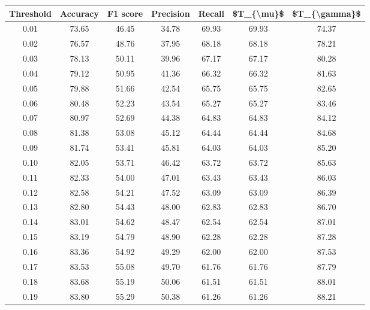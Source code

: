 \begin{tabular}{|c|c|c|c|c|c|c|}
\hline
 Threshold &  Accuracy &  F1 score &  Precision &  Recall &  \$T\_\{\textbackslash mu\}\$ &  \$T\_\{\textbackslash gamma\}\$ \\
\hline
      0.01 &     73.65 &     46.45 &      34.78 &   69.93 &      69.93 &         74.37 \\
      0.02 &     76.57 &     48.76 &      37.95 &   68.18 &      68.18 &         78.21 \\
      0.03 &     78.13 &     50.11 &      39.96 &   67.17 &      67.17 &         80.28 \\
      0.04 &     79.12 &     50.95 &      41.36 &   66.32 &      66.32 &         81.63 \\
      0.05 &     79.88 &     51.66 &      42.54 &   65.75 &      65.75 &         82.65 \\
      0.06 &     80.48 &     52.23 &      43.54 &   65.27 &      65.27 &         83.46 \\
      0.07 &     80.97 &     52.69 &      44.38 &   64.83 &      64.83 &         84.12 \\
      0.08 &     81.38 &     53.08 &      45.12 &   64.44 &      64.44 &         84.68 \\
      0.09 &     81.74 &     53.41 &      45.81 &   64.03 &      64.03 &         85.20 \\
      0.10 &     82.05 &     53.71 &      46.42 &   63.72 &      63.72 &         85.63 \\
      0.11 &     82.33 &     54.00 &      47.01 &   63.43 &      63.43 &         86.03 \\
      0.12 &     82.58 &     54.21 &      47.52 &   63.09 &      63.09 &         86.39 \\
      0.13 &     82.80 &     54.43 &      48.00 &   62.83 &      62.83 &         86.70 \\
      0.14 &     83.01 &     54.62 &      48.47 &   62.54 &      62.54 &         87.01 \\
      0.15 &     83.19 &     54.79 &      48.90 &   62.28 &      62.28 &         87.28 \\
      0.16 &     83.36 &     54.92 &      49.29 &   62.00 &      62.00 &         87.53 \\
      0.17 &     83.53 &     55.08 &      49.70 &   61.76 &      61.76 &         87.79 \\
      0.18 &     83.68 &     55.19 &      50.06 &   61.51 &      61.51 &         88.01 \\
      0.19 &     83.80 &     55.29 &      50.38 &   61.26 &      61.26 &         88.21 \\

\end{tabular}
